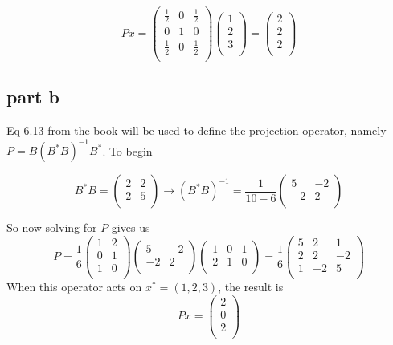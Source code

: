 \documentclass[a4paper,12pt]{article}
\begin{document}
\begin{equation}
Px =\begin{pmatrix}
\frac{1}{2}&0&\frac{1}{2}\\
0&1&0\\
\frac{1}{2}&0&\frac{1}{2}\\ 
\end{pmatrix}
\begin{pmatrix}
1\\
2\\
3\\ 
\end{pmatrix} =
\begin{pmatrix}
2\\
2\\
2\\ 
\end{pmatrix}
\end{equation}

\subsection{part b}
Eq 6.13 from the book will be used to define the projection operator, namely $P=B(B^*B)^{-1}B^*$. To begin

\begin{equation}
B^*B=\begin{pmatrix}
2&2\\
2&5\\ 
\end{pmatrix} \rightarrow (B^*B)^{-1} =\frac{1}{10-6}\begin{pmatrix}
5&-2\\
-2&2\\ 
\end{pmatrix}
\end{equation}

So now solving for $P$ gives us
\begin{equation}
P=\frac{1}{6}\begin{pmatrix}
1&2\\
0&1\\
1&0\\ 
\end{pmatrix}
\begin{pmatrix}
5&-2\\
-2&2\\ 
\end{pmatrix}
\begin{pmatrix}
1&0&1\\
2&1&0\\ 
\end{pmatrix} =\frac{1}{6}\begin{pmatrix}
5&2&1\\
2&2&-2\\
1&-2&5\\ 
\end{pmatrix}
\end{equation} When this operator acts on $x^*=(1,2,3)$, the result is
\begin{equation}
Px=\begin{pmatrix}
2\\
0\\
2\\ 
\end{pmatrix}
\end{equation}
\end{document}
